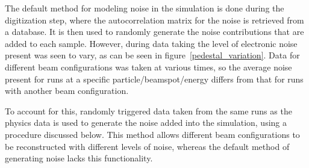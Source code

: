 The default method for modeling noise in the simulation is done during the digitization step, where the autocorrelation matrix for the noise is retrieved from a database. It is then used to randomly generate the noise contributions that are added to each sample. However, during data taking the level of electronic noise present was seen to vary, as can be seen in figure~\ref{pedestal_variation}. Data for different beam configurations was taken at various times, so the average noise present for runs at a specific particle/beamspot/energy differs from that for runs with another beam configuration. 

To account for this, randomly triggered data taken from the same runs as the physics data is used to generate the noise added into the simulation, using a procedure discussed below. This method allows different beam configurations to be reconstructed with different levels of noise, whereas the default method of generating noise lacks this functionality.


%
%
%
%
%
%
%
%
%
%
%
%
%
%
%
%
%
%
%
%
%
%
%
%
%
%

